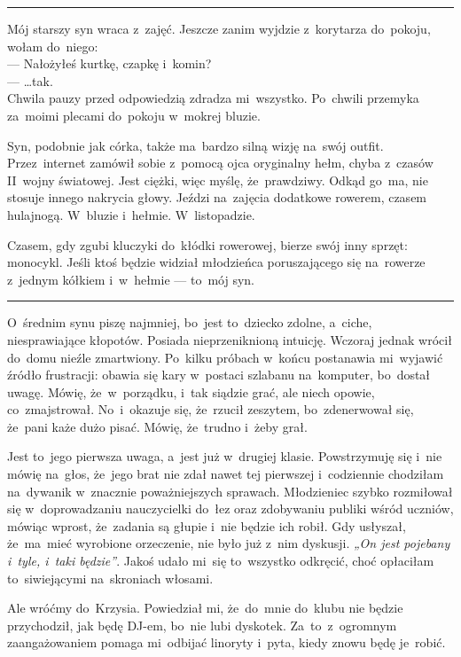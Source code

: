 \documentclass[9pt, a5paper]{memoir}
\begin{document}
\fancybreak{* \quad * \quad *}

Mój starszy syn wraca z~zajęć. Jeszcze zanim wyjdzie z~korytarza do~pokoju, wołam do~niego:\\
--- Nałożyłeś kurtkę, czapkę i~komin?\\
--- \dots{}tak.\\
Chwila pauzy przed odpowiedzią zdradza mi~wszystko. Po~chwili przemyka za~moimi plecami do~pokoju w~mokrej bluzie.

Syn, podobnie jak córka, także ma~bardzo silną wizję na~swój outfit. Przez~internet zamówił sobie z~pomocą ojca oryginalny hełm, chyba z~czasów II~wojny światowej. Jest ciężki, więc myślę, że~prawdziwy. Odkąd go~ma, nie stosuje innego nakrycia głowy. Jeździ na~zajęcia dodatkowe rowerem, czasem hulajnogą. W~bluzie i~hełmie. W~listopadzie.

Czasem, gdy zgubi kluczyki do~kłódki rowerowej, bierze swój inny sprzęt: monocykl. Jeśli ktoś będzie widział młodzieńca poruszającego się na~rowerze z~jednym kółkiem i~w~hełmie --- to~mój syn.

\fancybreak{* \quad * \quad *}

O~średnim synu piszę najmniej, bo~jest to~dziecko zdolne, a~ciche, niesprawiające kłopotów. Posiada nieprzeniknioną intuicję. Wczoraj jednak wrócił do~domu nieźle zmartwiony. Po~kilku próbach w~końcu postanawia mi~wyjawić źródło frustracji: obawia się kary w~postaci szlabanu na~komputer, bo~dostał uwagę. Mówię, że~w~porządku, i~tak siądzie grać, ale niech opowie, co~zmajstrował. No~i~okazuje się, że~rzucił zeszytem, bo~zdenerwował się, że~pani każe dużo pisać. Mówię, że~trudno i~żeby grał.

Jest to~jego pierwsza uwaga, a~jest już w~drugiej klasie. Powstrzymuję się i~nie mówię na~głos, że~jego brat nie zdał nawet tej pierwszej i~codziennie chodziłam na~dywanik w~znacznie poważniejszych sprawach. Młodzieniec szybko rozmiłował się w~doprowadzaniu nauczycielki do~łez oraz zdobywaniu publiki wśród uczniów, mówiąc wprost, że~zadania są głupie i~nie będzie ich robił. Gdy usłyszał, że~ma~mieć wyrobione orzeczenie, nie było już z~nim dyskusji. \textit{„On jest pojebany i~tyle, i~taki będzie”}. Jakoś udało mi~się to~wszystko odkręcić, choć opłaciłam to~siwiejącymi na~skroniach włosami.

Ale wróćmy do~Krzysia. Powiedział mi, że~do~mnie do~klubu nie będzie przychodził, jak będę DJ-em, bo~nie lubi dyskotek. Za~to~z~ogromnym zaangażowaniem pomaga mi~odbijać linoryty i~pyta, kiedy znowu będę je~robić.
\end{document}
